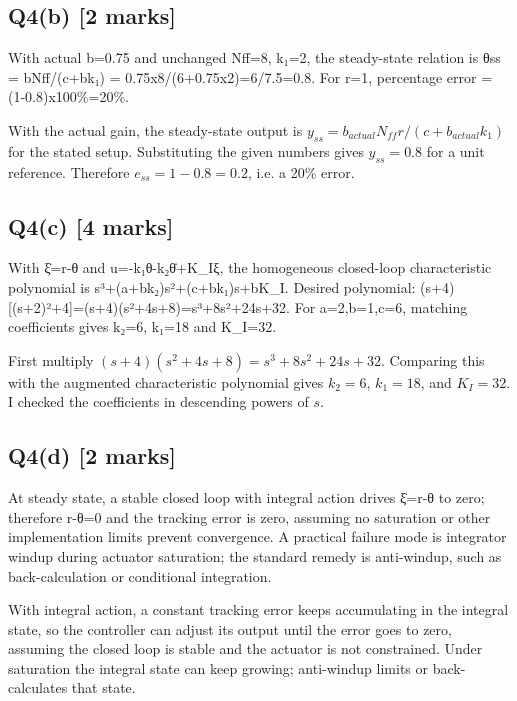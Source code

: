 \documentclass[11pt,a4paper]{article}
\begin{document}
\subsection*{Q4(b) \hfill [2 marks]}

With actual b=0.75 and unchanged Nff=8, k₁=2, the steady-state relation is θss = bNff/(c+bk₁) = 0.75x8/(6+0.75x2)=6/7.5=0.8.
For r=1, percentage error = (1-0.8)x100\%=20\%.\par\smallskip With the actual gain, the steady-state output is $y_{ss}=b_{actual}N_{ff}r/ (c+b_{actual}k_1)$ for the stated setup. Substituting the given numbers gives $y_{ss}=0.8$ for a unit reference. Therefore $e_{ss}=1-0.8=0.2$, i.e. a 20\% error.

\subsection*{Q4(c) \hfill [4 marks]}

With ξ̇=r-θ and u=-k₁θ-k₂θ̇+K\_Iξ, the homogeneous closed-loop characteristic polynomial is s³+(a+bk₂)s²+(c+bk₁)s+bK\_I.
Desired polynomial: (s+4)[(s+2)²+4]=(s+4)(s²+4s+8)=s³+8s²+24s+32.
For a=2,b=1,c=6, matching coefficients gives k₂=6, k₁=18 and K\_I=32.\par\smallskip First multiply $(s+4)(s^2+4s+8)=s^3+8s^2+24s+32$. Comparing this with the augmented characteristic polynomial gives $k_2=6$, $k_1=18$, and $K_I=32$. I checked the coefficients in descending powers of $s$.

\subsection*{Q4(d) \hfill [2 marks]}

At steady state, a stable closed loop with integral action drives ξ̇=r-θ to zero; therefore r-θ=0 and the tracking error is zero, assuming no saturation or other implementation limits prevent convergence.
A practical failure mode is integrator windup during actuator saturation; the standard remedy is anti-windup, such as back-calculation or conditional integration.\par\smallskip With integral action, a constant tracking error keeps accumulating in the integral state, so the controller can adjust its output until the error goes to zero, assuming the closed loop is stable and the actuator is not constrained. Under saturation the integral state can keep growing; anti-windup limits or back-calculates that state.
\end{document}

